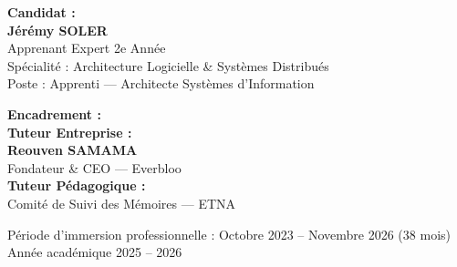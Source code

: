 \begin{titlepage}
\begin{center}
\vspace{0.8cm}

\begin{minipage}{0.48\textwidth}
    \begin{flushleft}
        \textbf{\large Candidat :}\\[4pt]
        \textbf{\large Jérémy SOLER}\\[2pt]
        \textcolor{DarkSlate}{Apprenant Expert 2e Année}\\[2pt]
        \textcolor{DarkSlate}{Spécialité : Architecture Logicielle \& Systèmes Distribués}\\[2pt]
        \textcolor{DarkSlate}{Poste : Apprenti — Architecte Systèmes d'Information}
    \end{flushleft}
\end{minipage}
\hfill
\begin{minipage}{0.48\textwidth}
    \begin{flushright}
        \textbf{\large Encadrement :}\\[4pt]
        \textbf{\large Tuteur Entreprise :}\\[2pt]
        \textbf{\textcolor{NavyBlue}{Reouven SAMAMA}}\\[2pt]
        \textcolor{DarkSlate}{Fondateur \& CEO — Everbloo}\\[6pt]
        \textbf{\large Tuteur Pédagogique :}\\[2pt]
        \textcolor{DarkSlate}{Comité de Suivi des Mémoires — ETNA}
    \end{flushright}
\end{minipage}

\vfill

{\small \textcolor{DarkSlate}{Période d'immersion professionnelle : Octobre 2023 – Novembre 2026 (38 mois)}}\\[3pt]
{\small \textcolor{DarkSlate}{Année académique 2025 -- 2026}}

\end{center}
\end{titlepage}
